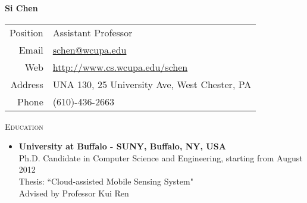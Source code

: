 \documentclass[letter]{article}
\newcommand{\heading}[1]{\item \large \textsc{#1} \normalsize}
\begin{document}
\Huge \textbf{Si Chen} \hfill \small
\begin{tabular}{rl}
Position & Assistant Professor \\
Email   & \href{mailto:schen@wcupa.edu}{schen@wcupa.edu} \\
Web     & \url{http://www.cs.wcupa.edu/schen} \\
Address & UNA 130, 25 University Ave, West Chester, PA\\
Phone  & (610)-436-2663\\
\end{tabular}

\normalsize

\begin{description}

%

%
%
%
%



\heading{Education}

\begin{itemize}
\item \textbf{University at Buffalo - SUNY, Buffalo, NY, USA} \\
Ph.D. Candidate in Computer Science and Engineering, starting from August 2012\\
Thesis: ``Cloud-assisted Mobile Sensing System" \\
Advised by Professor Kui Ren


\end{itemize}
\end{description}
\end{document}

